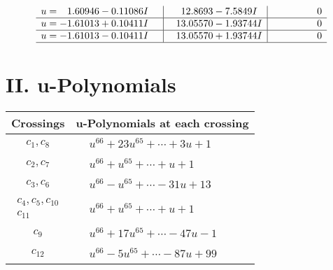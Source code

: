\documentclass[1p]{elsarticle_modified}
\theoremstyle{definition}
\begin{document}
$$\begin{array}{c|c|c}
\begin{aligned}
u &= \phantom{-}1.60946 - 0.11086 I\end{aligned}
 & \phantom{-}12.8693 - 7.5849 I & \phantom{-0.000000 } 0 \\ \hline\begin{aligned}
u &= -1.61013 + 0.10411 I\end{aligned}
 & \phantom{-}13.05570 - 1.93744 I & \phantom{-0.000000 } 0 \\ \hline\begin{aligned}
u &= -1.61013 - 0.10411 I\end{aligned}
 & \phantom{-}13.05570 + 1.93744 I & \phantom{-0.000000 } 0\\
 \hline 
 \end{array}$$\newpage
\newpage\renewcommand{\arraystretch}{1}
\centering \section*{ II. u-Polynomials}
\begin{tabular}{m{50pt}|m{274pt}}
Crossings & \hspace{64pt}u-Polynomials at each crossing \\
\hline $$\begin{aligned}c_{1},c_{8}\end{aligned}$$&$\begin{aligned}
&u^{66}+23 u^{65}+\cdots+3 u+1
\end{aligned}$\\
\hline $$\begin{aligned}c_{2},c_{7}\end{aligned}$$&$\begin{aligned}
&u^{66}+u^{65}+\cdots+u+1
\end{aligned}$\\
\hline $$\begin{aligned}c_{3},c_{6}\end{aligned}$$&$\begin{aligned}
&u^{66}- u^{65}+\cdots-31 u+13
\end{aligned}$\\
\hline $$\begin{aligned}c_{4},c_{5},c_{10}\\c_{11}\end{aligned}$$&$\begin{aligned}
&u^{66}+u^{65}+\cdots+u+1
\end{aligned}$\\
\hline $$\begin{aligned}c_{9}\end{aligned}$$&$\begin{aligned}
&u^{66}+17 u^{65}+\cdots-47 u-1
\end{aligned}$\\
\hline $$\begin{aligned}c_{12}\end{aligned}$$&$\begin{aligned}
&u^{66}-5 u^{65}+\cdots-87 u+99
\end{aligned}$\\
\hline
\end{tabular}\newpage\renewcommand{\arraystretch}{1}
\end{document}
